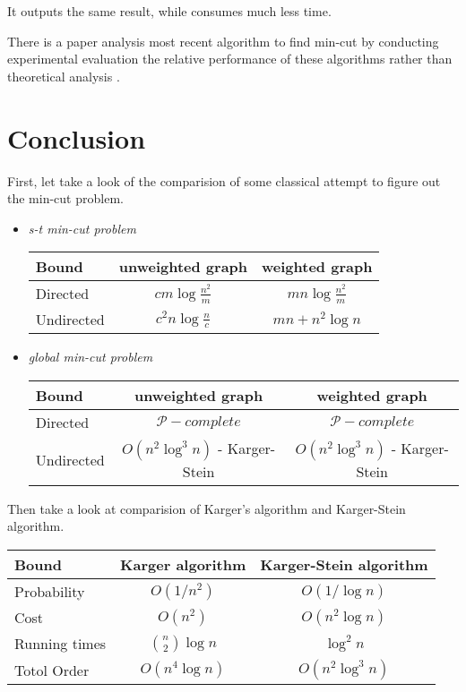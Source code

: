 \documentclass[11pt]{article}
\theoremstyle{plain}
\theoremstyle{definition}
\theoremstyle{remark}
\begin{document}
It outputs the same result, while consumes much less time.

There is a paper analysis most recent algorithm to find min-cut by conducting experimental evaluation the relative performance of these algorithms rather than theoretical analysis \cite{chekuri1997experimental}.

\section{Conclusion}
	
	
	First, let take a look of the comparision of some classical attempt to figure out the min-cut problem.
	\begin{itemize}
	\item \textit{s-t min-cut problem}
	\begin{center}
		\begin{tabular}{ l || c | c }
		\hline
		\textbf{Bound} & \textbf{unweighted graph} & \textbf{weighted graph} \\ \hline
		Directed & $ cm\log \frac{n^2}{m} $ \cite{gabow1991matroid} & $ mn\log \frac{n^2}{m} $\cite{hao1994faster} \\ \hline
		Undirected & $ c^2n\log \frac{n}{c} $\cite{gabow1991matroid} & $ mn+n^2\log n $ \cite{nagamochi1992computing} \\ 
		
		\hline
		\end{tabular}
	\end{center}
	
	\item \textit{global min-cut problem}
	\begin{center}
		\begin{tabular}{ l || c | c }
		\hline
		\textbf{Bound} & \textbf{unweighted graph} & \textbf{weighted graph} \\ \hline
		Directed & $ \mathcal{P}-complete $ & $ \mathcal{P}-complete $ \\ \hline
		Undirected & $ O(n^2\log^3 n) $ - Karger-Stein\cite{karger1996new} & $ O(n^2\log^3 n) $ - Karger-Stein\cite{karger1996new} \\
		\hline
		\end{tabular}
	\end{center}
	\end{itemize}
	
	Then take a look at comparision of Karger's algorithm and Karger-Stein algorithm.
	\begin{center}
	\begin{tabular}{ l || c | c }
	    \hline
	    \textbf{Bound}  & \textbf{Karger algorithm} & \textbf{Karger-Stein algorithm} \\ \hline
	    Probability & $ O(1/n^2) $ & $ O(1/\log n) $ \\ \hline
	    Cost & $ O(n^2) $ & $ O(n^2\log n) $ \\ \hline
	    Running times & $ {n \choose 2}\log n $ & $  \log^2 n $ \\ \hline
	    Totol Order & $ O(n^4\log n) $  & $ O(n^2 \log^3 n) $ \\
	    \hline
	\end{tabular}
	\end{center}
	
\end{document}
